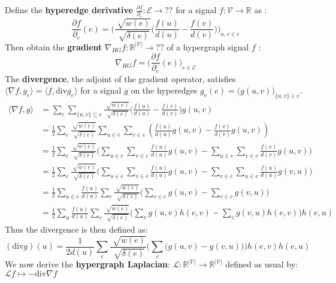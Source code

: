 \documentclass[12pt]{article}\pagestyle{myheadings}
\theoremstyle{plain}
\newcommand{\R}{\mathbb{R}}
\newcommand{\V}{\mathcal{V}}
\newcommand{\E}{\mathcal{E}}
\newcommand{\lapl}{\mathcal{L}}
\newcommand{\Div}{\text{div}}
\begin{document}
Define the \textbf{hyperedge derivative} $\frac{\partial f}{\partial_e} : \E \rightarrow ?? $ for a signal $f: \V \rightarrow \R$ as :
$$\frac{\partial f}{\partial_e} (e) =  \Bigg(\frac{\sqrt[]{w(e)}}{\sqrt[]{\delta(e)}}\bigg(\frac{f(u)}{d(u)}-\frac{f(v)}{d(v)} \bigg) \Bigg)_{u,v \in e} $$
Then obtain the \textbf{gradient} $\nabla_{HG} f: \R ^{|\V|} \rightarrow ??$  of a hypergraph signal $f$ :
$$ \nabla_{HG} f = \bigg( \frac{\partial f}{\partial_e}(e) \bigg)_{e \in \E}$$
The \textbf{divergence}, the adjoint of the gradient operator, satisfies $\langle \nabla f, g_e \rangle = \langle f, \Div g_e\rangle$ for a signal $g$ on the hyperedges $g_e(e) = \big( g(u,v) \big )_{\{ u,v\} \in e}$. 
\begin{equation*}
\begin{split}
\langle \nabla f, g \rangle  & = \sum_e \sum_{ \{u,v\} \subseteq e}\frac{\sqrt[]{w(e)}}{\sqrt[]{\delta(e)}}\bigg(\frac{f(u)}{d(u)}-\frac{f(v)}{d(v)} \bigg) g(u,v)\\
& = \frac{1}{2}\sum_e\frac{\sqrt[]{w(e)}}{\sqrt[]{\delta(e)}}  \sum_{u \in e} \sum_{v \in e} (\frac{f(u)}{d(u)}g(u,v)-\frac{f(v)}{d(v)}g(u,v))  \\
& =  \frac{1}{2}\sum_e \frac{\sqrt[]{w(e)}}{\sqrt[]{\delta(e)}} \big( \sum_{u \in e} \sum_{v \in e} \frac{f(u)}{d(u)}g(u,v) - \sum_{u \in e} \sum_{v \in e} \frac{f(v)}{d(v)}g(u,v) \big) \\
& = \frac{1}{2}\sum_e \frac{\sqrt[]{w(e)}}{\sqrt[]{\delta(e)}} \big( \sum_{u \in e} \sum_{v \in e} \frac{f(u)}{d(u)}g(u,v) - \sum_{v \in e} \sum_{u \in e} \frac{f(u)}{d(u)}g(v,u) \big) \\
& = \frac{1}{2}\sum_{u \in e} \frac{f(u)}{d(u)} \sum_e \frac{\sqrt[]{w(e)}}{\sqrt[]{\delta(e)}} \big(  \sum_{v \in e} g(u,v) - \sum_{v \in e}  g(v,u) \big) \\
& = \frac{1}{2}\sum_{u} \frac{f(u)}{d(u)} \sum_e \frac{\sqrt[]{w(e)}}{\sqrt[]{\delta(e)}} \big(  \sum_{v } g(u,v)h(e,v) - \sum_{v}  g(v,u)h(e,v) \big)h(e,u) 
\end{split}
\end{equation*}
Thus the divergence is then defined as:
$$(\Div g)(u) = \frac{1}{2d(u)} \sum_e \frac{\sqrt[]{w(e)}}{\sqrt[]{\delta(e)}} \big(  \sum_{v } \big( g(u,v)-  g(v,u) \big)\big)h(e,v) h(e,u)$$
We now derive the \textbf{hypergraph Laplacian}: $\lapl: \R^{|\V|} \rightarrow \R^{|\V|}$ defined as usual by: $ \lapl f \mapsto -\Div \nabla f$
\end{document}
